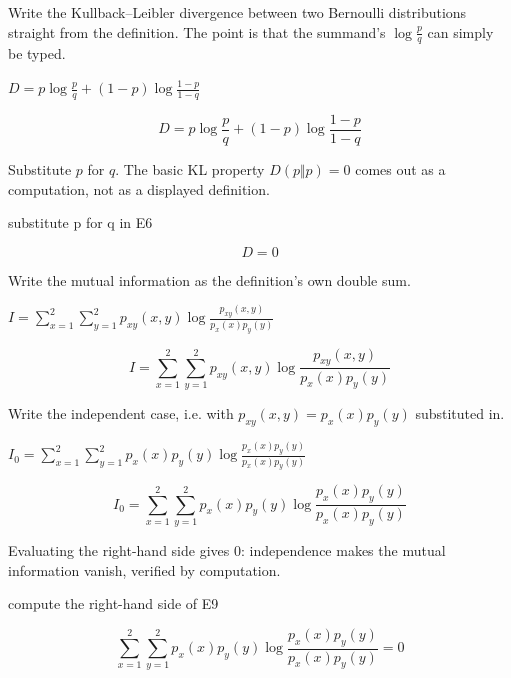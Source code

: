 \documentclass[dvipdfmx]{article}
\begin{document}
Write the Kullback–Leibler divergence between two Bernoulli distributions straight from the definition. The point is that the summand's $\log\frac{p}{q}$ can simply be typed.

$D = p\log \frac{p}{q} + (1-p)\log \frac{1-p}{1-q}$

\begin{equation}
  D = p\log \frac{p}{q} + (1-p)\log \frac{1-p}{1-q}
  \label{eq:E6}
\end{equation}

Substitute $p$ for $q$. The basic KL property $D(p\Vert p)=0$ comes out as a computation, not as a displayed definition.

substitute p for q in E6

\begin{equation}
  D = 0
  \label{eq:E7}
\end{equation}

Write the mutual information as the definition's own double sum.

$I = \sum_{x=1}^{2}\sum_{y=1}^{2} p_{xy}(x,y)\log \frac{p_{xy}(x,y)}{p_x(x) p_y(y)}$

\begin{equation}
  I = \sum_{x=1}^{2}\sum_{y=1}^{2} p_{xy}(x,y)\log \frac{p_{xy}(x,y)}{p_x(x) p_y(y)}
  \label{eq:E8}
\end{equation}

Write the independent case, i.e. with $p_{xy}(x,y)=p_x(x)p_y(y)$ substituted in.

$I_0 = \sum_{x=1}^{2}\sum_{y=1}^{2} p_x(x) p_y(y)\log \frac{p_x(x) p_y(y)}{p_x(x) p_y(y)}$

\begin{equation}
  I_0 = \sum_{x=1}^{2}\sum_{y=1}^{2} p_x(x) p_y(y)\log \frac{p_x(x) p_y(y)}{p_x(x) p_y(y)}
  \label{eq:E9}
\end{equation}

Evaluating the right-hand side gives 0: independence makes the mutual information vanish, verified by computation.

compute the right-hand side of E9

\begin{equation}
  \sum_{x=1}^{2}\sum_{y=1}^{2} p_x(x) p_y(y)\log \frac{p_x(x) p_y(y)}{p_x(x) p_y(y)} = 0
  \label{eq:E10}
\end{equation}
\end{document}

